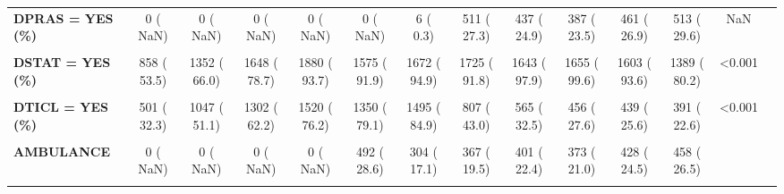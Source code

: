 \documentclass[
]{article}
\begin{document}
\begin{table}[H]
\begin{tabular}[t]{>{\raggedright\arraybackslash}p{5em}ccccccccccccc}
\textbf{DPRAS = YES (\%)} & 0 (  NaN) & 0 (  NaN) & 0 (  NaN) & 0 (  NaN) & 0 (  NaN) & 6 (  0.3) & 511 ( 27.3) & 437 ( 24.9) & 387 ( 23.5) & 461 ( 26.9) & 513 ( 29.6) & NaN & \\
\textbf{\cellcolor{gray!10}{DRUG = YES (\%)}} & \cellcolor{gray!10}{0 (  NaN)} & \cellcolor{gray!10}{0 (  NaN)} & \cellcolor{gray!10}{162 ( 15.8)} & \cellcolor{gray!10}{432 ( 36.0)} & \cellcolor{gray!10}{276 ( 25.4)} & \cellcolor{gray!10}{394 ( 34.2)} & \cellcolor{gray!10}{698 ( 58.2)} & \cellcolor{gray!10}{1146 ( 94.6)} & \cellcolor{gray!10}{1056 ( 98.1)} & \cellcolor{gray!10}{0 (  NaN)} & \cellcolor{gray!10}{0 (  NaN)} & \cellcolor{gray!10}{NaN} & \cellcolor{gray!10}{}\\
\textbf{DSTAT = YES (\%)} & 858 ( 53.5) & 1352 ( 66.0) & 1648 ( 78.7) & 1880 ( 93.7) & 1575 ( 91.9) & 1672 ( 94.9) & 1725 ( 91.8) & 1643 ( 97.9) & 1655 ( 99.6) & 1603 ( 93.6) & 1389 ( 80.2) & <0.001 & \\
\textbf{\cellcolor{gray!10}{DTICGR = YES (\%)}} & \cellcolor{gray!10}{0 (  NaN)} & \cellcolor{gray!10}{0 (  NaN)} & \cellcolor{gray!10}{0 (  NaN)} & \cellcolor{gray!10}{0 (  NaN)} & \cellcolor{gray!10}{0 (  NaN)} & \cellcolor{gray!10}{0 (  NaN)} & \cellcolor{gray!10}{288 ( 15.5)} & \cellcolor{gray!10}{545 ( 31.1)} & \cellcolor{gray!10}{821 ( 49.8)} & \cellcolor{gray!10}{595 ( 34.8)} & \cellcolor{gray!10}{382 ( 22.0)} & \cellcolor{gray!10}{NaN} & \cellcolor{gray!10}{}\\
\textbf{DTICL = YES (\%)} & 501 ( 32.3) & 1047 ( 51.1) & 1302 ( 62.2) & 1520 ( 76.2) & 1350 ( 79.1) & 1495 ( 84.9) & 807 ( 43.0) & 565 ( 32.5) & 456 ( 27.6) & 439 ( 25.6) & 391 ( 22.6) & <0.001 & \\
\textbf{\cellcolor{gray!10}{ECGLOC (\%)}} & \cellcolor{gray!10}{} & \cellcolor{gray!10}{} & \cellcolor{gray!10}{} & \cellcolor{gray!10}{} & \cellcolor{gray!10}{} & \cellcolor{gray!10}{} & \cellcolor{gray!10}{} & \cellcolor{gray!10}{} & \cellcolor{gray!10}{} & \cellcolor{gray!10}{} & \cellcolor{gray!10}{} & \cellcolor{gray!10}{NaN} & \cellcolor{gray!10}{}\\
\textbf{AMBULANCE} & 0 (  NaN) & 0 (  NaN) & 0 (  NaN) & 0 (  NaN) & 492 ( 28.6) & 304 ( 17.1) & 367 ( 19.5) & 401 ( 22.4) & 373 ( 21.0) & 428 ( 24.5) & 458 ( 26.5) &  & \\
\textbf{\cellcolor{gray!10}{ED}} & \cellcolor{gray!10}{0 (  NaN)} & \cellcolor{gray!10}{0 (  NaN)} & \cellcolor{gray!10}{0 (  NaN)} & \cellcolor{gray!10}{0 (  NaN)} & \cellcolor{gray!10}{979 ( 56.9)} & \cellcolor{gray!10}{920 ( 51.9)} & \cellcolor{gray!10}{951 ( 50.5)} & \cellcolor{gray!10}{869 ( 48.5)} & \cellcolor{gray!10}{891 ( 50.1)} & \cellcolor{gray!10}{920 ( 52.7)} & \cellcolor{gray!10}{958 ( 55.4)} & \cellcolor{gray!10}{} & \cellcolor{gray!10}{}\\

\end{tabular}
\end{table}
\end{document}
